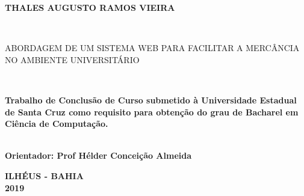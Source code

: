 
\begin{center}

    {\large \begin{large} \bfseries THALES AUGUSTO RAMOS VIEIRA \end{large}\\}
    \vspace{8cm}
    {\large\bfseries{\begin{large}ABORDAGEM DE UM SISTEMA WEB PARA FACILITAR A MERCÂNCIA NO AMBIENTE UNIVERSITÁRIO \end{large}}\\}
    \vspace{1cm}
    \hspace{.45\linewidth}
    \begin{minipage}{.50\linewidth}

            \textbf{Trabalho de Conclusão de Curso submetido à Universidade Estadual de Santa Cruz como requisito 
            para obtenção do grau de Bacharel em Ciência de Computação. }

            \textbf{\\ Orientador: Prof Hélder Conceição Almeida}
           
    
    \end{minipage}

    \vspace{2cm}
    \vfill
    {\large\bfseries{ ILHÉUS - BAHIA \\ 2019}}
\end{center}

